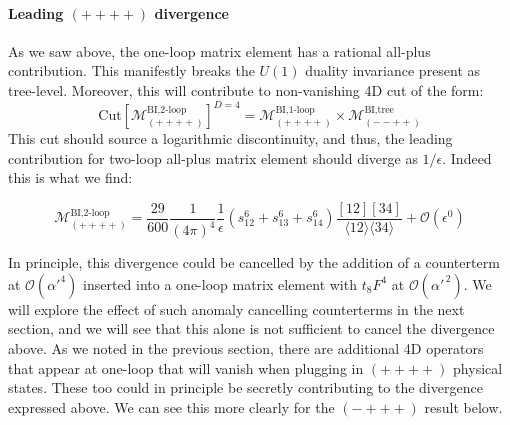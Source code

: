 \documentclass[11pt,letter]{article}
\begin{document}
\paragraph{Leading $(++++)$ divergence} As we saw above, the one-loop matrix element has a rational all-plus contribution. This manifestly breaks the $U(1)$ duality invariance present as tree-level. Moreover, this will contribute to non-vanishing 4D cut of the form:
\begin{equation}
\text{Cut}\left[\mathcal{M}^{\text{BI,2-loop}}_{(++++)} \right]^{D=4} = \mathcal{M}^{\text{BI,1-loop}}_{(++++)} \times \mathcal{M}^{\text{BI,tree}}_{(--++)} 
\end{equation}
This cut should source a logarithmic discontinuity, and thus, the leading contribution for two-loop all-plus matrix element should diverge as $1/\epsilon$. Indeed this is what we find:
\begin{eBox}
\begin{equation}
\label{eq:allPlus2}
\mathcal{M}^{\text{BI,2-loop}}_{(++++)} = \frac{29}{600} \frac{1}{(4\pi)^4}\frac{1}{\epsilon}(s_{12}^6+s_{13}^6+s_{14}^6)\frac{[12][34]}{\langle 12\rangle \langle 34\rangle }+\mathcal{O}(\epsilon^0)
\end{equation}
\end{eBox}
In principle, this divergence could be cancelled by the addition of a counterterm at $\mathcal{O}(\alpha'^4)$ inserted into a one-loop matrix element with $t_8F^4$ at $\mathcal{O}(\alpha'^{\,2})$. We will explore the effect of such anomaly cancelling counterterms in the next section, and we will see that this alone is not sufficient to cancel the divergence above. As we noted in the previous section, there are additional 4D operators that appear at one-loop that will vanish when plugging in $(++++)$ physical states. These too could in principle be secretly contributing to the divergence expressed above. We can see this more clearly for the $(-+++)$ result below. 
\end{document}
